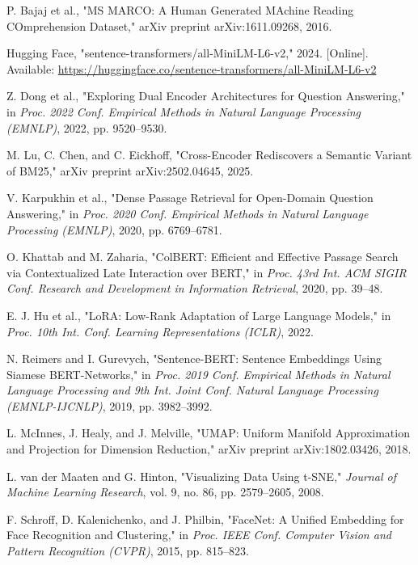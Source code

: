 \documentclass[conference]{IEEEtran}
\begin{document}
\begin{thebibliography}{00}
 P. Bajaj et al., "MS MARCO: A Human Generated MAchine Reading COmprehension Dataset," arXiv preprint arXiv:1611.09268, 2016.

 Hugging Face, "sentence-transformers/all-MiniLM-L6-v2," 2024. [Online]. Available: \url{https://huggingface.co/sentence-transformers/all-MiniLM-L6-v2}

 Z. Dong et al., "Exploring Dual Encoder Architectures for Question Answering," in \textit{Proc. 2022 Conf. Empirical Methods in Natural Language Processing (EMNLP)}, 2022, pp. 9520--9530.

 M. Lu, C. Chen, and C. Eickhoff, "Cross-Encoder Rediscovers a Semantic Variant of BM25," arXiv preprint arXiv:2502.04645, 2025.

 V. Karpukhin et al., "Dense Passage Retrieval for Open-Domain Question Answering," in \textit{Proc. 2020 Conf. Empirical Methods in Natural Language Processing (EMNLP)}, 2020, pp. 6769--6781.

 O. Khattab and M. Zaharia, "ColBERT: Efficient and Effective Passage Search via Contextualized Late Interaction over BERT," in \textit{Proc. 43rd Int. ACM SIGIR Conf. Research and Development in Information Retrieval}, 2020, pp. 39--48.

 E. J. Hu et al., "LoRA: Low-Rank Adaptation of Large Language Models," in \textit{Proc. 10th Int. Conf. Learning Representations (ICLR)}, 2022.

 N. Reimers and I. Gurevych, "Sentence-BERT: Sentence Embeddings Using Siamese BERT-Networks," in \textit{Proc. 2019 Conf. Empirical Methods in Natural Language Processing and 9th Int. Joint Conf. Natural Language Processing (EMNLP-IJCNLP)}, 2019, pp. 3982--3992.

 L. McInnes, J. Healy, and J. Melville, "UMAP: Uniform Manifold Approximation and Projection for Dimension Reduction," arXiv preprint arXiv:1802.03426, 2018.

 L. van der Maaten and G. Hinton, "Visualizing Data Using t-SNE," \textit{Journal of Machine Learning Research}, vol. 9, no. 86, pp. 2579--2605, 2008.

 F. Schroff, D. Kalenichenko, and J. Philbin, "FaceNet: A Unified Embedding for Face Recognition and Clustering," in \textit{Proc. IEEE Conf. Computer Vision and Pattern Recognition (CVPR)}, 2015, pp. 815--823.


\end{thebibliography}
\end{document}

